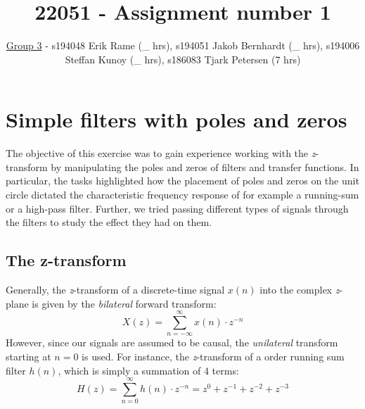 \documentclass[journal]{IEEEtran}
\begin{document}
\title{22051 - Assignment number 1}
\author{\underline{Group 3} - s194048 Erik Rame (\_ hrs), s194051 Jakob Bernhardt (\_ hrs), s194006 Steffan Kunoy (\_ hrs), s186083 Tjark Petersen (7 hrs)}


\maketitle



\section{Simple filters with poles and zeros}
The objective of this exercise was to gain experience working with the \textit{z}-transform by manipulating the poles and zeros of filters and transfer functions. In particular, the tasks highlighted how the placement of poles and zeros on the unit circle dictated the characteristic frequency response of for example a running-sum or a high-pass filter. Further, we tried passing different types of signals through the filters to study the effect they had on them. 

\subsection{The z-transform}
Generally, the \textit{z}-transform of a discrete-time signal $x(n)$ into the complex \textit{z}-plane is given by the \textit{bilateral} forward transform: 
\begin{equation}
\label{eqn:z_transform}
    X(z) = \sum_{n=-\infty}^{\infty} x(n) \cdot z^{-n}
\end{equation}
However, since our signals are assumed to be causal, the \textit{unilateral} transform starting at $n=0$ is used. For instance, the \textit{z}-transform of a  order running sum filter $h(n)$, which is simply a summation of 4 terms: 
\begin{equation}
\label{eqn:third_order_rs}
    H(z) = \sum_{n=0}^{\infty} h(n) \cdot z^{-n} = z^{0} + z^{-1} + z^{-2} + z^{-3} 
\end{equation}
\end{document}
